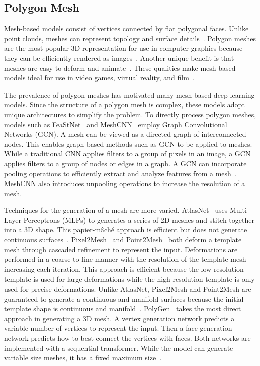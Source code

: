 \subsection{Polygon Mesh}
\label{subsec:polygon_mesh}

Mesh-based models consist of vertices connected by flat polygonal faces. Unlike point clouds, meshes can represent topology and surface details~\cite{Xiao2020}. Polygon meshes are the most popular 3D representation for use in computer graphics because they can be efficiently rendered as images~\cite{Watt1996}. Another unique benefit is that meshes are easy to deform and animate~\cite{Wang2018}. These qualities make mesh-based models ideal for use in video games, virtual reality, and film~\cite{Nash2020}.

The prevalence of polygon meshes has motivated many mesh-based deep learning models. Since the structure of a polygon mesh is complex, these models adopt unique architectures to simplify the problem. To directly process polygon meshes, models such as FeaStNet~\cite{Verma2018} and MeshCNN~\cite{Hanocka2019} employ Graph Convolutional Networks (GCN). A mesh can be viewed as a directed graph of interconnected nodes. This enables graph-based methods such as GCN to be applied to meshes. While a traditional CNN applies filters to a group of pixels in an image, a GCN applies filters to a group of nodes or edges in a graph. A GCN can incorporate pooling operations to efficiently extract and analyze features from a mesh~\cite{Verma2018}. MeshCNN also introduces unpooling operations to increase the resolution of a mesh.

Techniques for the generation of a mesh are more varied. AtlasNet~\cite{Groueix2018} uses Multi-Layer Perceptrons (MLPs) to generates a series of 2D meshes and stitch together into a 3D shape. This papier-m\^{a}ch\'{e} approach is efficient but does not generate continuous surfaces~\cite{Groueix2018}. Pixel2Mesh~\cite{Wang2018} and Point2Mesh~\cite{Hanocka2020} both deform a template mesh through cascaded refinement to represent the input. Deformations are performed in a coarse-to-fine manner with the resolution of the template mesh increasing each iteration. This approach is efficient because the low-resolution template is used for large deformations while the high-resolution template is only used for precise deformations. Unlike AtlasNet, Pixel2Mesh and Point2Mesh are guaranteed to generate a continuous and manifold surfaces because the initial template shape is continuous and manifold~\cite{Wang2018, Hanocka2020}. PolyGen~\cite{Nash2020} takes the most direct approach in generating a 3D mesh. A vertex generation network predicts a variable number of vertices to represent the input. Then a face generation network predicts how to best connect the vertices with faces. Both networks are implemented with a sequential transformer. While the model can generate variable size meshes, it has a fixed maximum size~\cite{Nash2020}.


